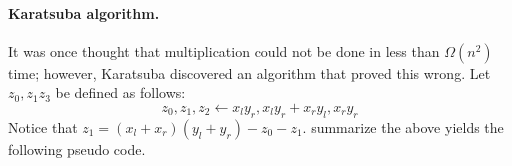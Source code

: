 \paragraph{Karatsuba algorithm.}
It was once thought that multiplication could not be done in less than $\Omega\left(n^2\right)$ time; however, Karatsuba discovered an algorithm \cite{Karatsuba1963MultiplicationOM} that proved this wrong. Let $z_{0},z_{1}z_{3}$ be defined as follows:
\begin{equation*}
z_0, z_1, z_2 \leftarrow x_{l}y_{r}, x_{l}y_{r} + x_{r}y_{l}, x_{r}y_{r}
\end{equation*}Notice that \( z_1 = \left(x_{l}+x_{r}\right)\left(y_{l}+y_{r}\right) - z_{0} -z_{1} \). summarize the above yields the following pseudo code. 

